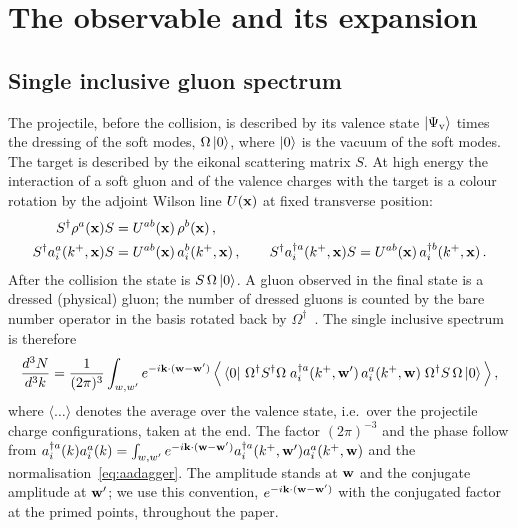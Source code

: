 \section{The observable and its expansion}\label{sec:observable}


\subsection{Single inclusive gluon spectrum}\label{sec:observable_def}

The projectile, before the collision, is described by its valence state $\ket{\Psi_{\rm v}}$ times the dressing of the soft modes, $\Omega\ket{0}$, where $\ket0$ is the vacuum of the soft modes. The target is described by the eikonal scattering matrix $S$. At high energy the interaction of a soft gluon and of the valence charges with the target is a colour rotation by the adjoint Wilson line $U(\mathbf{x})$ at fixed transverse position:
\begin{align}\label{eq:Srotation}
S^\dagger\rho^a(\mathbf{x})S&=U^{ab}(\mathbf{x})\,\rho^b(\mathbf{x})\,,\notag\\
S^\dagger a^a_i(k^+,\mathbf{x})S&=U^{ab}(\mathbf{x})\,a^b_i(k^+,\mathbf{x})\,,\qquad
S^\dagger a^{\dagger a}_i(k^+,\mathbf{x})S=U^{ab}(\mathbf{x})\,a^{\dagger b}_i(k^+,\mathbf{x})\,.
\end{align}
After the collision the state is $S\,\Omega\ket0$. A gluon observed in the final state is a dressed (physical) gluon; the number of dressed gluons is counted by the bare number operator in the basis rotated back by $\Omega^\dagger$~\cite{Kovner:2006wr}. The single inclusive spectrum is therefore
\begin{align}\label{eq:observable}
\frac{d^3N}{d^3k}=\frac{1}{(2\pi)^3}\int_{w,w'}e^{-i\mathbf{k}\cdot(\mathbf{w}-\mathbf{w}')}\,
\Big\langle\bra0\,\Omega^\dagger S^\dagger\Omega\;a^{\dagger a}_i(k^+,\mathbf{w}')\,a^a_i(k^+,\mathbf{w})\;\Omega^\dagger S\,\Omega\ket0\Big\rangle\,,
\end{align}
where $\langle\dots\rangle$ denotes the average over the valence state, i.e.\ over the projectile charge configurations, taken at the end. The factor $(2\pi)^{-3}$ and the phase follow from $a^{\dagger a}_i(k)a^a_i(k)=\int_{w,w'}e^{-i\mathbf{k}\cdot(\mathbf{w}-\mathbf{w}')}a^{\dagger a}_i(k^+,\mathbf{w}')a^a_i(k^+,\mathbf{w})$ and the normalisation~\eqref{eq:aadagger}. The amplitude stands at $\mathbf{w}$ and the conjugate amplitude at $\mathbf{w}'$; we use this convention, $e^{-i\mathbf{k}\cdot(\mathbf{w}-\mathbf{w}')}$ with the conjugated factor at the primed points, throughout the paper.

